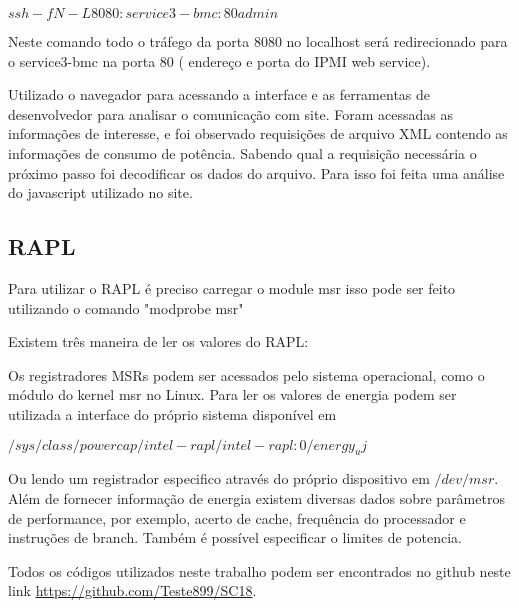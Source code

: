 $ssh -fN -L 8080:service3-bmc:80 admin$

Neste comando todo o tráfego da porta 8080 no localhost será redirecionado para o service3-bmc na porta 80 ( endereço e porta do IPMI web service).

Utilizado o navegador para acessando a interface e as ferramentas de desenvolvedor para analisar o comunicação com site. Foram acessadas as informações de interesse, e foi observado requisições de arquivo XML contendo as informações de consumo de potência. Sabendo qual a requisição necessária o próximo passo foi decodificar os dados do arquivo. Para isso foi feita uma análise do javascript utilizado no site.


\subsection{RAPL}
Para utilizar o RAPL é preciso carregar o module msr  isso pode ser feito utilizando o comando "modprobe msr"

Existem três maneira de ler os valores do RAPL:

Os registradores MSRs podem ser acessados pelo sistema operacional, como o módulo do kernel msr no Linux. Para ler os valores de energia podem ser utilizada a interface do próprio sistema disponível em

$/sys/class/powercap/intel-rapl/intel-rapl:0/energy_uj$ 
 
Ou lendo um registrador especifico através do próprio dispositivo em $/dev/msr$.
Além de fornecer informação de energia existem diversas dados sobre parâmetros de performance, por exemplo, acerto de cache, frequência do processador e instruções de branch. Também é possível especificar o limites de potencia.


Todos os códigos utilizados neste trabalho podem ser encontrados no github neste link \url{https://github.com/Teste899/SC18}.